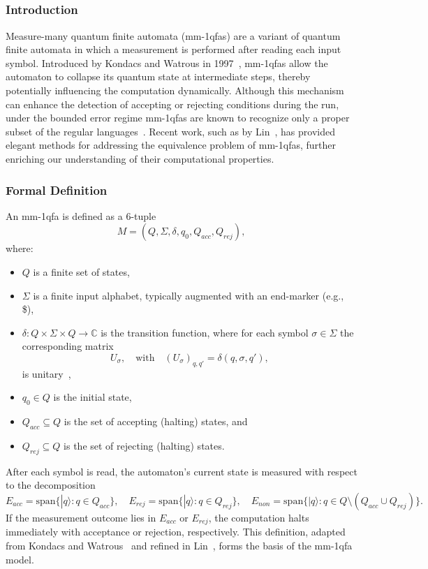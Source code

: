 \subsection{}
\label{sec:mmqfa}

\subsubsection{Introduction}
Measure-many quantum finite automata (\gls{mm-1qfa}s) are a variant of quantum finite automata in which a measurement is performed after reading each input symbol. Introduced by Kondacs and Watrous in 1997~\cite{646094}, \gls{mm-1qfa}s allow the automaton to collapse its quantum state at intermediate steps, thereby potentially influencing the computation dynamically. Although this mechanism can enhance the detection of accepting or rejecting conditions during the run, under the bounded error regime \gls{mm-1qfa}s are known to recognize only a proper subset of the regular languages~\cite{brodsky2002characterizations}. Recent work, such as by Lin~\cite{LIN2012807}, has provided elegant methods for addressing the equivalence problem of \gls{mm-1qfa}s, further enriching our understanding of their computational properties.

\subsubsection{Formal Definition}
An \gls{mm-1qfa} is defined as a 6-tuple
\[
M = (Q,\Sigma,\delta,q_0,Q_{acc},Q_{rej}),
\]
where:
\begin{itemize}
    \item $Q$ is a finite set of states,
    \item $\Sigma$ is a finite input alphabet, typically augmented with an end-marker (e.g., \$),
    \item $\delta : Q \times \Sigma \times Q \to \mathbb{C}$ is the transition function, where for each symbol $\sigma\in\Sigma$ the corresponding matrix 
    \[
    U_\sigma,\quad \text{with} \quad (U_\sigma)_{q,q'}=\delta(q,\sigma,q'),
    \]
    is unitary~\cite{646094},
    \item $q_0 \in Q$ is the initial state,
    \item $Q_{acc} \subseteq Q$ is the set of accepting (halting) states, and
    \item $Q_{rej} \subseteq Q$ is the set of rejecting (halting) states.
\end{itemize}
After each symbol is read, the automaton's current state is measured with respect to the decomposition
\[
E_{acc} = \text{span}\{|q\rangle : q \in Q_{acc}\},\quad
E_{rej} = \text{span}\{|q\rangle : q \in Q_{rej}\},\quad
E_{non} = \text{span}\{|q\rangle : q \in Q \setminus (Q_{acc}\cup Q_{rej})\}.
\]
If the measurement outcome lies in $E_{acc}$ or $E_{rej}$, the computation halts immediately with acceptance or rejection, respectively. This definition, adapted from Kondacs and Watrous~\cite{646094} and refined in Lin~\cite{LIN2012807}, forms the basis of the \gls{mm-1qfa} model.

